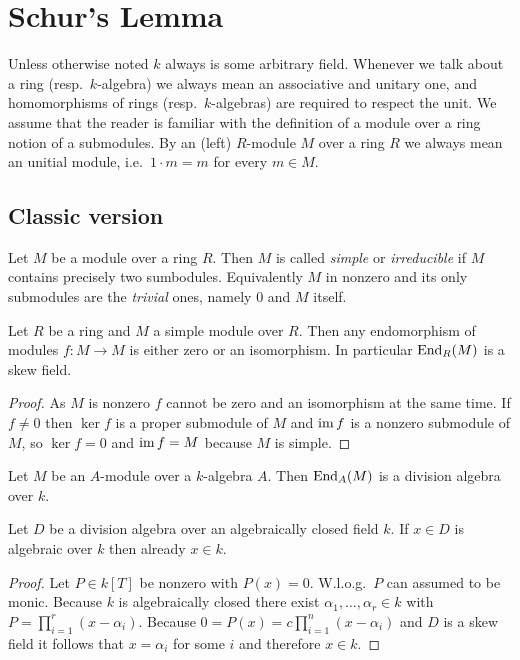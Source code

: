 \chapter{Schur’s Lemma}
Unless otherwise noted $k$ always is some arbitrary field. Whenever we talk about a ring (resp.\ $k$-algebra) we always mean an associative and unitary one, and homomorphisms of rings (resp.\ $k$-algebras) are required to respect the unit. We assume that the reader is familiar with the definition of a module over a ring notion of a submodules. By an (left) $R$-module $M$ over a ring $R$ we always mean an unitial module, i.e.\ $1 \cdot m = m$ for every $m \in M$.





\section{Classic version}


\begin{definition}
 Let $M$ be a module over a ring $R$. Then $M$ is called \emph{simple} or \emph{irreducible} if $M$ contains precisely two sumbodules. Equivalently $M$ in nonzero and its only submodules are the \emph{trivial} ones, namely $0$ and $M$ itself.
\end{definition}


\begin{lemma}[Schur] \label{lem: Schur general part about skew field}
 Let $R$ be a ring and $M$ a simple module over $R$. Then any endomorphism of modules $f \colon M \to M$ is either zero or an isomorphism. In particular $\operatorname{End}_R(M)$ is a skew field.
\end{lemma}
\begin{proof}
 As $M$ is nonzero $f$ cannot be zero and an isomorphism at the same time. If $f \neq 0$ then $\ker f$ is a proper submodule of $M$ and $\operatorname{im} f$ is a nonzero submodule of $M$, so $\ker f = 0$ and $\operatorname{im} f = M$ because $M$ is simple.
\end{proof}


\begin{corollary}
 Let $M$ be an $A$-module over a $k$-algebra $A$. Then $\operatorname{End}_A(M)$ is a division algebra over $k$.
\end{corollary}


\begin{lemma}\label{lem: algebraic elements over algebraically closed fields}
 Let $D$ be a division algebra over an algebraically closed field $k$. If $x \in D$ is algebraic over $k$ then already $x \in k$.
\end{lemma}
\begin{proof}
 Let $P \in k[T]$ be nonzero with $P(x) = 0$. W.l.o.g.\ $P$ can assumed to be monic. Because $k$ is algebraically closed there exist $\alpha_1, \dotsc, \alpha_r \in k$ with $P = \prod_{i=1}^r (x-\alpha_i)$. Because $0 = P(x) = c \prod_{i=1}^n (x-\alpha_i)$ and $D$ is a skew field it follows that $x = \alpha_i$ for some $i$ and therefore $x \in k$.
\end{proof}


